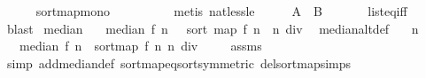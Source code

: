 \begin{isabellebody}
\ \ \ \ \isamarkupfalse%
\ sort{\isacharunderscore}{\kern0pt}map{\isacharunderscore}{\kern0pt}mono\ \ \ \ \isanewline
\ \ \ \ \isamarkupfalse%
\ {\isacharparenleft}{\kern0pt}metis\ nat{\isacharunderscore}{\kern0pt}less{\isacharunderscore}{\kern0pt}le{\isacharparenright}{\kern0pt}\isanewline
\ \ \isamarkupfalse%
\ \isamarkupfalse%
\ {\isachardoublequoteopen}{\isacharquery}{\kern0pt}A\ {\isacharequal}{\kern0pt}\ {\isacharquery}{\kern0pt}B{\isachardoublequoteclose}\ \isanewline
\ \ \ \ \isamarkupfalse%
\ list{\isacharunderscore}{\kern0pt}eq{\isacharunderscore}{\kern0pt}iff\ \isamarkupfalse%
\ blast\isanewline
{}\isamarkupfalse%
%
\endisatagproof
{\isafoldproof}%
%
\isadelimproof
\isanewline
%
\endisadelimproof
\isanewline
{}\isamarkupfalse%
\ median\ \isanewline
\ \ {\isachardoublequoteopen}median\ f\ n\ {\isacharequal}{\kern0pt}\ \ sort\ {\isacharparenleft}{\kern0pt}map\ f\ {\isacharbrackleft}{\kern0pt}{}{\isachardot}{\kern0pt}{\isachardot}{\kern0pt}{\isacharless}{\kern0pt}n{\isacharbrackright}{\kern0pt}{\isacharparenright}{\kern0pt}\ {\isacharbang}{\kern0pt}\ {\isacharparenleft}{\kern0pt}n\ div\ {}{\isacharparenright}{\kern0pt}{\isachardoublequoteclose}\isanewline
\isanewline
{}\isamarkupfalse%
\ median{\isacharunderscore}{\kern0pt}alt{\isacharunderscore}{\kern0pt}def{\isacharcolon}{\kern0pt}\isanewline
\ \ \ {\isachardoublequoteopen}n\ {\isachargreater}{\kern0pt}\ {}{\isachardoublequoteclose}\isanewline
\ \ \ {\isachardoublequoteopen}median\ f\ n\ {\isacharequal}{\kern0pt}\ {\isacharparenleft}{\kern0pt}sort{\isacharunderscore}{\kern0pt}map\ f\ n{\isacharparenright}{\kern0pt}\ {\isacharparenleft}{\kern0pt}n\ div\ {}{\isacharparenright}{\kern0pt}{\isachardoublequoteclose}\isanewline
%
\isadelimproof
\ \ %
\endisadelimproof
%
\isatagproof
{}\isamarkupfalse%
\ assms\isanewline
\ \ \isamarkupfalse%
\ {\isacharparenleft}{\kern0pt}simp\ add{\isacharcolon}{\kern0pt}median{\isacharunderscore}{\kern0pt}def\ sort{\isacharunderscore}{\kern0pt}map{\isacharunderscore}{\kern0pt}eq{\isacharunderscore}{\kern0pt}sort{\isacharbrackleft}{\kern0pt}symmetric{\isacharbrackright}{\kern0pt}\ del{\isacharcolon}{\kern0pt}sort{\isacharunderscore}{\kern0pt}map{\isachardot}{\kern0pt}simps{\isacharparenright}{\kern0pt}%
\endisatagproof
{\isafoldproof}%
%
\isadelimproof
\isanewline
%
\endisadelimproof

\end{isabellebody}
